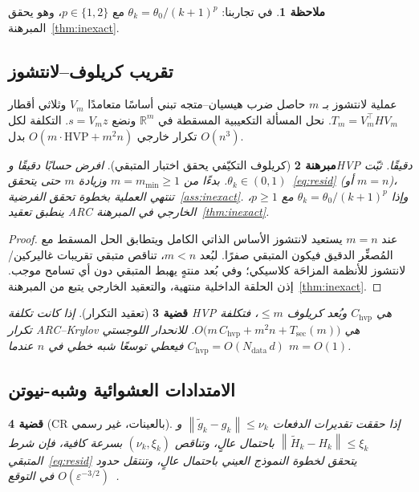 \documentclass[11pt,a4paper]{article}
\theoremstyle{plain}
\newtheorem{theorem}{مبرهنة}[section]
\newtheorem{proposition}[theorem]{قضية}
\theoremstyle{definition}
\newtheorem{remark}[theorem]{ملاحظة}
\newcommand{\R}{\mathbb{R}}
\newcommand{\norm}[1]{\left\|#1\right\|}
\begin{document}
\begin{remark}
في تجاربنا: $\theta_{k}=\theta_{0}/(k+1)^{p}$ مع $p\in\{1,2\}$، وهو يحقق المبرهنة~\ref{thm:inexact}.
\end{remark}

\subsection{تقريب كريلوف--لانتشوز}

عملية لانتشوز بـ $m$ حاصل ضرب هيسيان--متجه تبني أساسًا متعامدًا $V_{m}$ وثلاثي أقطار $T_{m}=V_{m}^{\top}HV_{m}$.
نحل المسألة التكعيبية المسقطة في $\R^{m}$ ونضع $s=V_{m}z$.
التكلفة لكل تكرار خارجي $O(m\cdot\mathrm{HVP}+m^{2}n)$ بدل $O(n^{3})$.

\begin{theorem}[كريلوف التكيّفي يحقق اختبار المتبقي]
\label{thm:krylov-adapt}
افرض حسابًا دقيقًا وHVP دقيقًا.
ثبّت $\theta_{k}\in(0,1)$.
بدءًا من $m=m_{\min}\ge 1$ وزيادة $m$ حتى يتحقق~\eqref{eq:resid} (أو $m=n$)، تنتهي العملية بخطوة تحقق الفرضية~\ref{ass:inexact}.
وإذا $\theta_{k}=\theta_{0}/(k+1)^{p}$ مع $p\ge 1$، ينطبق تعقيد ARC الخارجي في المبرهنة~\ref{thm:inexact}.
\end{theorem}

\begin{proof}
عند $m=n$ يستعيد لانتشوز الأساس الذاتي الكامل ويتطابق الحل المسقط مع المُصغِّر الدقيق فيكون المتبقي صفرًا.
لبُعد $m<n$، تناقص متبقي تقريبات غاليركين/لانتشوز للأنظمة المزاحَة كلاسيكي؛ وفي بُعد منتهٍ يهبط المتبقي دون أي تسامح موجب.
إذن الحلقة الداخلية منتهية، والتعقيد الخارجي يتبع من المبرهنة~\ref{thm:inexact}.
\end{proof}

\begin{proposition}[تعقيد التكرار]
\label{prop:cost}
إذا كانت تكلفة HVP هي $C_{\mathrm{hvp}}$ وبُعد كريلوف $\le m$، فتكلفة تكرار ARC--Krylov هي
$O\bigl(m\,C_{\mathrm{hvp}}+m^{2}n+T_{\mathrm{sec}}(m)\bigr)$.
للانحدار اللوجستي $C_{\mathrm{hvp}}=O(N_{\mathrm{data}}\,d)$ فيعطي توسعًا شبه خطي في $n$ عندما $m=O(1)$.
\end{proposition}

\subsection{الامتدادات العشوائية وشبه-نيوتن}

\begin{proposition}[CR بالعينات، غير رسمي]
\label{prop:stoch}
إذا حققت تقديرات الدفعات $\norm{\tilde g_{k}-g_{k}}\le\nu_{k}$ و$\norm{\tilde H_{k}-H_{k}}\le\xi_{k}$ باحتمال عالٍ، وتناقص $(\nu_{k},\xi_{k})$ بسرعة كافية، فإن شرط المتبقي~\eqref{eq:resid} يتحقق لخطوة النموذج العيني باحتمال عالٍ، وتنتقل حدود $O(\varepsilon^{-3/2})$ في التوقع~\cite{kohler2017subsampled,xu2016sub}.
\end{proposition}
\end{document}
